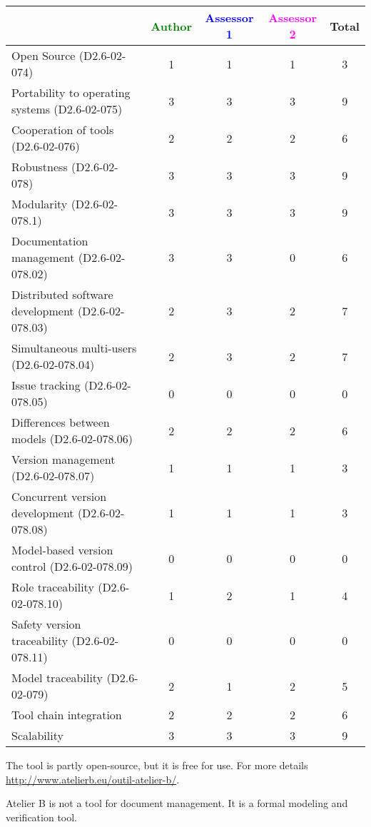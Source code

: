 \begin{tabular}{|l | c | c | c | c|}
\hline
& \textcolor{green}{Author} & \textcolor{blue}{Assessor 1} & \textcolor{magenta}{Assessor 2} & Total \\
\hline 
Open Source (D2.6-02-074) & 1 & 1 & 1 & 3 \\
\hline 
Portability to operating systems (D2.6-02-075) & 3 & 3 & 3 & 9 \\
\hline
Cooperation of tools (D2.6-02-076) & 2 & 2 & 2 & 6 \\
\hline
Robustness (D2.6-02-078) & 3 & 3 & 3 & 9 \\
\hline
Modularity (D2.6-02-078.1) & 3 & 3 & 3 & 9 \\
\hline
Documentation management (D2.6-02-078.02) & 3 & 3 & 0 & 6 \\
\hline
Distributed software development (D2.6-02-078.03)  & 2 & 3 & 2 & 7 \\
\hline
Simultaneous multi-users (D2.6-02-078.04)   & 2 & 3 & 2 & 7 \\
\hline
Issue tracking (D2.6-02-078.05) & 0 & 0 & 0 & 0 \\
\hline
Differences between models (D2.6-02-078.06) & 2 & 2 & 2 & 6 \\
\hline
Version management (D2.6-02-078.07) & 1 & 1 & 1 & 3 \\
\hline
Concurrent version development (D2.6-02-078.08) & 1 & 1 & 1 & 3 \\
\hline
Model-based version control (D2.6-02-078.09) & 0 & 0 & 0 & 0 \\
\hline
Role traceability (D2.6-02-078.10) & 1 & 2 & 1 & 4 \\
\hline
Safety version traceability (D2.6-02-078.11) & 0 & 0 & 0 & 0 \\
\hline
Model traceability (D2.6-02-079) & 2 & 1 & 2 & 5 \\
\hline
Tool chain integration & 2 & 2 & 2 & 6 \\
\hline
Scalability & 3 & 3 & 3& 9 \\
\hline
\end{tabular}

\begin{author_comment}
The tool is partly open-source, but it is free for use.
For more details \url{http://www.atelierb.eu/outil-atelier-b/}.
\end{author_comment}


\begin{assessor2}
Atelier B is not a tool for document management. It is a formal modeling and verification tool.
\end{assessor2}

